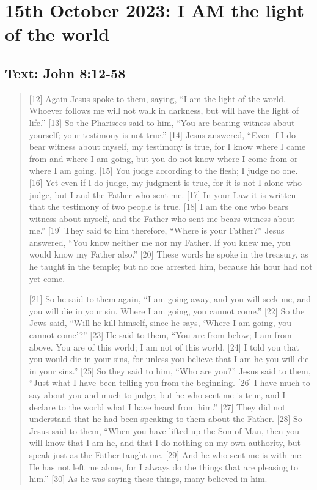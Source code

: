 \setcounter{figure}{0}

\section{15th October 2023: I AM the light of the world}
\subsection*{Text: John 8:12-58}
  \begin{quote}
  [12] Again Jesus spoke to them, saying, “I am the light of the world. Whoever follows me will not walk in darkness, but will have the light of life.” [13] So the Pharisees said to him, “You are bearing witness about yourself; your testimony is not true.” [14] Jesus answered, “Even if I do bear witness about myself, my testimony is true, for I know where I came from and where I am going, but you do not know where I come from or where I am going. [15] You judge according to the flesh; I judge no one. [16] Yet even if I do judge, my judgment is true, for it is not I alone who judge, but I and the Father who sent me. [17] In your Law it is written that the testimony of two people is true. [18] I am the one who bears witness about myself, and the Father who sent me bears witness about me.” [19] They said to him therefore, “Where is your Father?” Jesus answered, “You know neither me nor my Father. If you knew me, you would know my Father also.” [20] These words he spoke in the treasury, as he taught in the temple; but no one arrested him, because his hour had not yet come.

  [21] So he said to them again, “I am going away, and you will seek me, and you will die in your sin. Where I am going, you cannot come.” [22] So the Jews said, “Will he kill himself, since he says, ‘Where I am going, you cannot come’?” [23] He said to them, “You are from below; I am from above. You are of this world; I am not of this world. [24] I told you that you would die in your sins, for unless you believe that I am he you will die in your sins.” [25] So they said to him, “Who are you?” Jesus said to them, “Just what I have been telling you from the beginning. [26] I have much to say about you and much to judge, but he who sent me is true, and I declare to the world what I have heard from him.” [27] They did not understand that he had been speaking to them about the Father. [28] So Jesus said to them, “When you have lifted up the Son of Man, then you will know that I am he, and that I do nothing on my own authority, but speak just as the Father taught me. [29] And he who sent me is with me. He has not left me alone, for I always do the things that are pleasing to him.” [30] As he was saying these things, many believed in him.


\end{quote}

